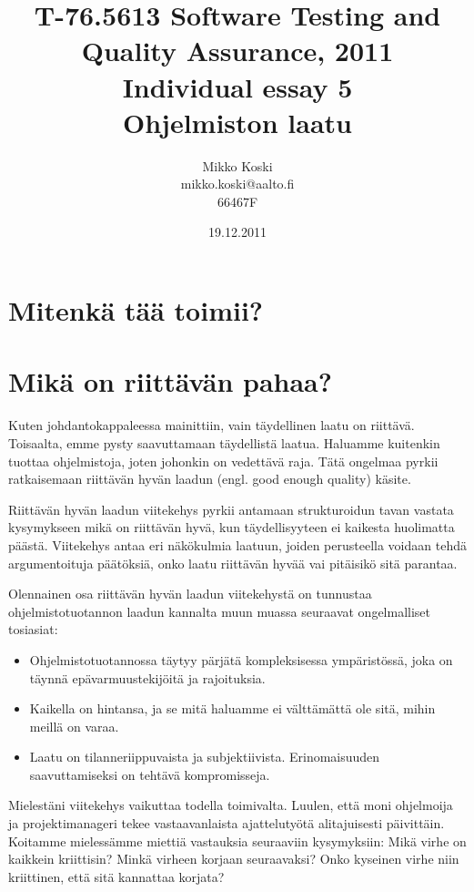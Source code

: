 \documentclass[a4paper]{article}
\begin{document}
\title{\small T-76.5613 Software Testing and Quality Assurance, 2011 \\ Individual essay 5 \\ \huge Ohjelmiston laatu}
\date{19.12.2011}
\author{Mikko Koski \\ mikko.koski@aalto.fi \\ 66467F}
\maketitle

\large

\section{Mitenkä tää toimii?}

\section{Mikä on riittävän pahaa?}

Kuten johdantokappaleessa mainittiin, vain täydellinen laatu on riittävä. Toisaalta, emme pysty saavuttamaan täydellistä laatua. Haluamme kuitenkin tuottaa ohjelmistoja, joten johonkin on vedettävä raja. Tätä ongelmaa pyrkii ratkaisemaan riittävän hyvän laadun (engl. good enough quality) käsite.

Riittävän hyvän laadun viitekehys pyrkii antamaan strukturoidun tavan vastata kysymykseen mikä on riittävän hyvä, kun täydellisyyteen ei kaikesta huolimatta päästä. Viitekehys antaa eri näkökulmia laatuun, joiden perusteella voidaan tehdä argumentoituja päätöksiä, onko laatu riittävän hyvää vai pitäisikö sitä parantaa. \citet{bach1997}

Olennainen osa riittävän hyvän laadun viitekehystä on tunnustaa ohjelmistotuotannon laadun kannalta muun muassa seuraavat ongelmalliset tosiasiat: 

\begin{itemize}
\item Ohjelmistotuotannossa täytyy pärjätä kompleksisessa ympäristössä, joka on täynnä epävarmuustekijöitä ja rajoituksia. 
\item Kaikella on hintansa, ja se mitä haluamme ei välttämättä ole sitä, mihin meillä on varaa. 
\item Laatu on tilanneriippuvaista ja subjektiivista. Erinomaisuuden saavuttamiseksi on tehtävä kompromisseja.
\end{itemize}

Mielestäni viitekehys vaikuttaa todella toimivalta. Luulen, että moni ohjelmoija ja projektimanageri tekee vastaavanlaista ajattelutyötä alitajuisesti päivittäin. Koitamme mielessämme miettiä vastauksia seuraaviin kysymyksiin: Mikä virhe on kaikkein kriittisin? Minkä virheen korjaan seuraavaksi? Onko kyseinen virhe niin kriittinen, että sitä kannattaa korjata?
\end{document}
